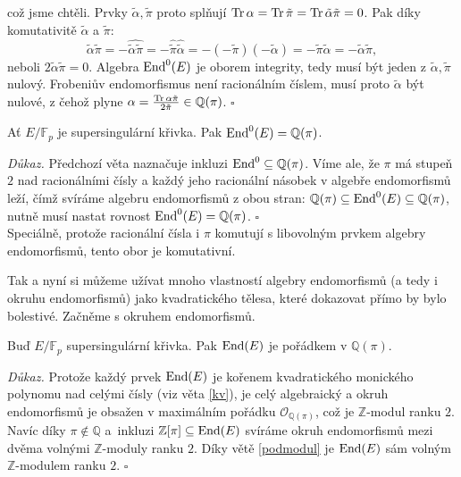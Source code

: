 \documentclass[12pt]{report}
\begin{document}
což jsme chtěli. Prvky $\tilde{\alpha}, \tilde{\pi}$ proto splňují $\operatorname{Tr} \alpha = \operatorname{Tr} \tilde{\pi} = \operatorname{Tr} \tilde{\alpha} \tilde{\pi} = 0$. Pak díky komutativitě $\tilde{\alpha}$ a $\tilde{\pi}$:
\begin{equation*}
\tilde{\alpha} \tilde{\pi} = -\widehat{\tilde{\alpha} \tilde{\pi}} = - \widehat{\tilde{\pi}} \widehat{\tilde{\alpha}} = - (- \tilde{\pi}) (-\tilde{\alpha}) = - \tilde{\pi} \tilde{\alpha}= - \tilde{\alpha} \tilde{\pi}, 
\end{equation*}
neboli $2 \tilde{\alpha} \tilde{\pi} = 0$. Algebra $\operatorname{End}^0 (E)$ je oborem integrity, tedy musí být jeden z $\tilde{\alpha},\tilde{\pi}$ nulový. Frobeniův endomorfismus není racionálním číslem, musí proto $\tilde{\alpha}$ být nulové, z čehož plyne $\alpha = \frac{\operatorname{Tr} \alpha \tilde{\pi}}{2 \tilde{\pi}} \in \mathbb{Q}(\pi)$. \hfill $\square$\\

\begin{dusledek}
Ať $E/\mathbb{F}_p$ je supersingulární křivka. Pak $\operatorname{End}^0 (E) = \mathbb{Q}(\pi)$.
\end{dusledek}
\noindent \textit{Důkaz.} Předchozí věta naznačuje inkluzi $\operatorname{End}^0 \subseteq \mathbb{Q}(\pi)$. Víme ale, že $\pi$ má stupeň $2$ nad racionálními čísly a každý jeho racionální násobek v algebře endomorfismů leží, čímž svíráme algebru endomorfismů z obou stran: $\mathbb{Q}(\pi) \subseteq \operatorname{End} ^0 (E) \subseteq \mathbb{Q}(\pi)$, nutně musí nastat rovnost $\operatorname{End}^0 (E) = \mathbb{Q}(\pi)$. \hfill $\square$\\

Speciálně, protože racionální čísla i $\pi$ komutují s libovolným prvkem algebry endomorfismů, tento obor je komutativní. 

Tak a nyní si můžeme užívat mnoho vlastností algebry endomorfismů (a tedy i okruhu endomorfismů) jako kvadratického tělesa, které dokazovat přímo by bylo bolestivé. Začněme s okruhem endomorfismů.

\begin{veta}
Buď $E/\mathbb{F}_p$ supersingulární křivka. Pak $\operatorname{End}(E)$ je pořádkem v $\mathbb{Q}(\pi)$. 
\end{veta}
\noindent \textit{Důkaz.} Protože každý prvek $\operatorname{End}(E)$ je kořenem kvadratického monického polynomu nad celými čísly (viz věta \ref{kv}), je celý algebraický a okruh endomorfismů je obsažen v maximálním pořádku $\mathcal{O}_{\mathbb{Q}(\pi)}$, což je $\mathbb{Z}$-modul ranku $2$. Navíc díky $\pi \not\in \mathbb{Q}$ a~inkluzi $\mathbb{Z}[\pi] \subseteq \operatorname{End}(E)$ svíráme okruh endomorfismů mezi dvěma volnými $\mathbb{Z}$-moduly ranku $2$. Díky větě \ref{podmodul} je $\operatorname{End}(E)$ sám volným $\mathbb{Z}$-modulem ranku $2$. \hfill $\square$\\
\end{document}
